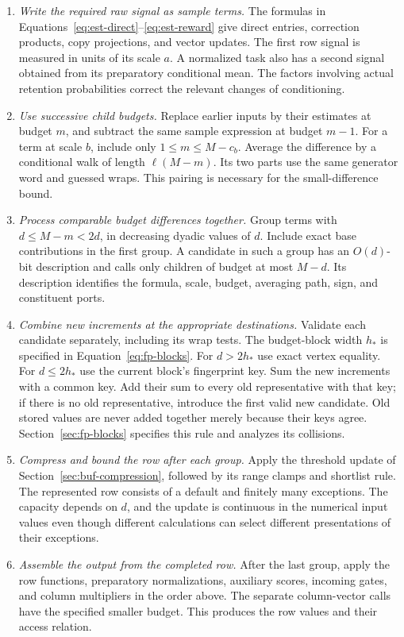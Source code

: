 \begin{enumerate}[leftmargin=*]
\item \emph{Write the required raw signal as sample terms.} The formulas in Equations~\eqref{eq:est-direct}--\eqref{eq:est-reward} give direct entries, correction products, copy projections, and vector updates. The first row signal is measured in units of its scale $a$. A normalized task also has a second signal obtained from its preparatory conditional mean. The factors involving actual retention probabilities correct the relevant changes of conditioning.

\item \emph{Use successive child budgets.} Replace earlier inputs by their estimates at budget $m$, and subtract the same sample expression at budget $m-1$. For a term at scale $b$, include only $1\le m\le M-c_b$. Average the difference by a conditional walk of length $\ell(M-m)$. Its two parts use the same generator word and guessed wraps. This pairing is necessary for the small-difference bound.

\item \emph{Process comparable budget differences together.} Group terms with $d\le M-m<2d$, in decreasing dyadic values of $d$. Include exact base contributions in the first group. A candidate in such a group has an $O(d)$-bit description and calls only children of budget at most $M-d$. Its description identifies the formula, scale, budget, averaging path, sign, and constituent ports.

\item \emph{Combine new increments at the appropriate destinations.} Validate each candidate separately, including its wrap tests. The budget-block width $h_*$ is specified in Equation~\eqref{eq:fp-blocks}. For $d>2h_*$ use exact vertex equality. For $d\le2h_*$ use the current block's fingerprint key. Sum the new increments with a common key. Add their sum to every old representative with that key; if there is no old representative, introduce the first valid new candidate. Old stored values are never added together merely because their keys agree. Section~\ref{sec:fp-blocks} specifies this rule and analyzes its collisions.

\item \emph{Compress and bound the row after each group.} Apply the threshold update of Section~\ref{sec:buf-compression}, followed by its range clamps and shortlist rule. The represented row consists of a default and finitely many exceptions. The capacity depends on $d$, and the update is continuous in the numerical input values even though different calculations can select different presentations of their exceptions.

\item \emph{Assemble the output from the completed row.} After the last group, apply the row functions, preparatory normalizations, auxiliary scores, incoming gates, and column multipliers in the order above. The separate column-vector calls have the specified smaller budget. This produces the row values and their access relation.
\end{enumerate}

